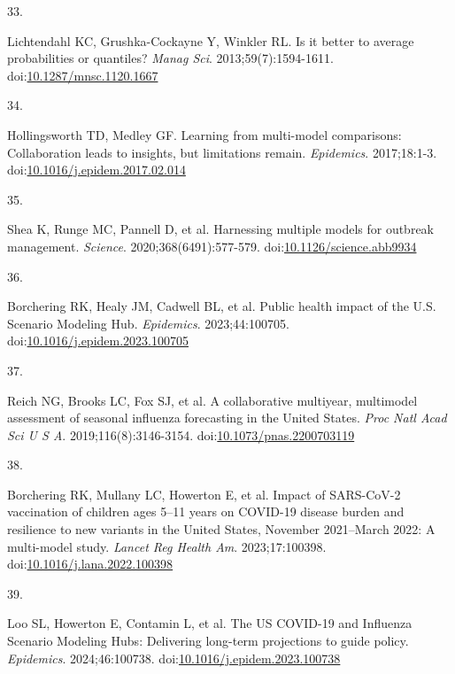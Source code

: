 \documentclass[
]{article}
\newlength{\cslhangindent}
\newlength{\csllabelwidth}
\newenvironment{CSLReferences}[2] %
 {\begin{list}{}{%
  \setlength{\itemindent}{0pt}
  \setlength{\leftmargin}{0pt}
  \setlength{\parsep}{0pt}
  \ifodd #1
   \setlength{\leftmargin}{\cslhangindent}
   \setlength{\itemindent}{-1\cslhangindent}
  \fi
  \setlength{\itemsep}{#2\baselineskip}}}
 {\end{list}}
\newcommand{\CSLLeftMargin}[1]{\parbox[t]{\csllabelwidth}{\strut#1\strut}}
\newcommand{\CSLRightInline}[1]{\parbox[t]{\linewidth - \csllabelwidth}{\strut#1\strut}}
\begin{document}
\begin{CSLReferences}{0}{1}
\CSLLeftMargin{33. }%
\CSLRightInline{Lichtendahl KC, Grushka-Cockayne Y, Winkler RL. Is it
better to average probabilities or quantiles? \emph{Manag Sci}.
2013;59(7):1594-1611.
doi:\href{https://doi.org/10.1287/mnsc.1120.1667}{10.1287/mnsc.1120.1667}}

\CSLLeftMargin{34. }%
\CSLRightInline{Hollingsworth TD, Medley GF. Learning from multi-model
comparisons: {Collaboration} leads to insights, but limitations remain.
\emph{Epidemics}. 2017;18:1-3.
doi:\href{https://doi.org/10.1016/j.epidem.2017.02.014}{10.1016/j.epidem.2017.02.014}}

\CSLLeftMargin{35. }%
\CSLRightInline{Shea K, Runge MC, Pannell D, et al. Harnessing multiple
models for outbreak management. \emph{Science}. 2020;368(6491):577-579.
doi:\href{https://doi.org/10.1126/science.abb9934}{10.1126/science.abb9934}}

\CSLLeftMargin{36. }%
\CSLRightInline{Borchering RK, Healy JM, Cadwell BL, et al. Public
health impact of the {U}.{S}. {Scenario} {Modeling} {Hub}.
\emph{Epidemics}. 2023;44:100705.
doi:\href{https://doi.org/10.1016/j.epidem.2023.100705}{10.1016/j.epidem.2023.100705}}

\CSLLeftMargin{37. }%
\CSLRightInline{Reich NG, Brooks LC, Fox SJ, et al. A collaborative
multiyear, multimodel assessment of seasonal influenza forecasting in
the {United} {States}. \emph{Proc Natl Acad Sci U S A}.
2019;116(8):3146-3154.
doi:\href{https://doi.org/10.1073/pnas.2200703119}{10.1073/pnas.2200703119}}

\CSLLeftMargin{38. }%
\CSLRightInline{Borchering RK, Mullany LC, Howerton E, et al. Impact of
{SARS}-{CoV}-2 vaccination of children ages 5--11 years on {COVID}-19
disease burden and resilience to new variants in the {United} {States},
{November} 2021--{March} 2022: {A} multi-model study. \emph{Lancet Reg
Health Am}. 2023;17:100398.
doi:\href{https://doi.org/10.1016/j.lana.2022.100398}{10.1016/j.lana.2022.100398}}

\CSLLeftMargin{39. }%
\CSLRightInline{Loo SL, Howerton E, Contamin L, et al. The {US}
{COVID}-19 and {Influenza} {Scenario} {Modeling} {Hubs}: {Delivering}
long-term projections to guide policy. \emph{Epidemics}. 2024;46:100738.
doi:\href{https://doi.org/10.1016/j.epidem.2023.100738}{10.1016/j.epidem.2023.100738}}


\end{CSLReferences}
\end{document}
